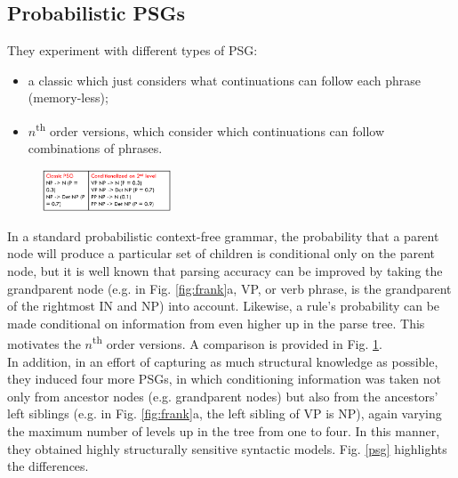 \subsection{Probabilistic PSGs}
They experiment with different types of PSG:
\begin{itemize}
    \item a classic which just considers what continuations can follow each phrase (memory-less);
\end{itemize}

\begin{itemize}
    \item $n$\textsuperscript{th} order versions, which consider which continuations can follow combinations of phrases.
\end{itemize}

\begin{figure}
  \centering
  \includegraphics[width=0.34\textwidth]{images/psg.png}
  \caption{}
  \label{fig:psg}
\end{figure}

In a standard probabilistic context-free grammar, the probability that a parent node will produce a particular set of children is conditional only on the parent node, but it is well known that parsing accuracy can be improved by taking the grandparent node (e.g. in Fig. \ref{fig:frank}a, VP, or verb phrase, is the grandparent of the rightmost IN and NP) into account. Likewise, a rule's probability can be made conditional on information from even higher up in the parse tree. This motivates the $n$\textsuperscript{th} order versions. A comparison is provided in Fig. \ref{fig:psg}.\\

In addition, in an effort of capturing as much structural knowledge as possible, they induced four more PSGs, in which conditioning information was taken not only from ancestor nodes (e.g. grandparent nodes) but also from the ancestors' left siblings (e.g. in Fig. \ref{fig:frank}a, the left sibling of VP is NP), again varying the maximum number of levels up in the tree from one to four. In this manner, they obtained highly structurally sensitive syntactic models. Fig. \ref{psg} highlights the differences.

